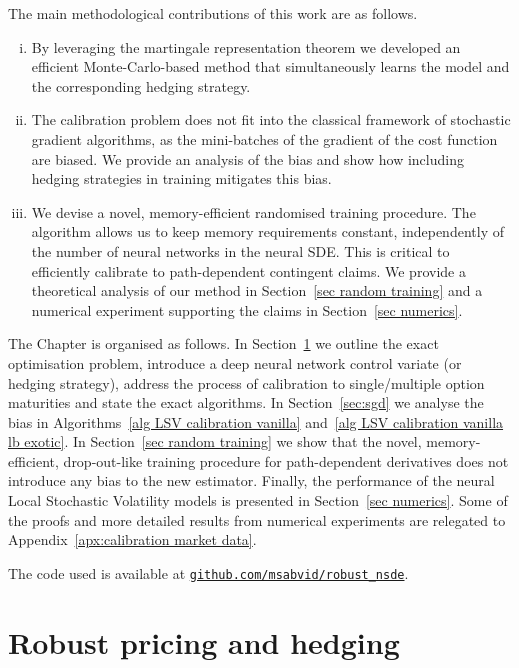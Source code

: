 The main methodological contributions of this work are as follows. 
\begin{enumerate}[i)]
\item By leveraging the martingale representation theorem we developed an efficient Monte-Carlo-based method that simultaneously learns the model and the corresponding hedging strategy.
\item The calibration problem does not fit into the classical framework of stochastic gradient algorithms, as the mini-batches of the gradient of the cost function are biased. 
We provide an analysis of the bias and show how including hedging strategies in training mitigates this bias.  
\item We devise a novel, memory-efficient randomised training procedure. 
The algorithm allows us to keep memory requirements constant, independently of the number of neural networks in the neural SDE.
This is critical to efficiently calibrate to path-dependent contingent claims. 
We provide a theoretical analysis of our method in Section~\ref{sec random training} and a numerical experiment supporting the claims in Section~\ref{sec numerics}. 
 \end{enumerate}

The Chapter is organised as follows. In Section~\ref{sec:Hedging} we outline the exact optimisation problem, introduce a deep neural network control variate (or hedging strategy), address the process of calibration to single/multiple option maturities and state the exact algorithms.
In Section~\ref{sec:sgd} we analyse the bias in Algorithms~\ref{alg LSV calibration vanilla} and~\ref{alg LSV calibration vanilla lb exotic}.
In Section~\ref{sec random training} we show that the novel, memory-efficient, drop-out-like training procedure for path-dependent derivatives does not introduce any bias to the new estimator. 
Finally, the performance of the neural Local Stochastic Volatility models is presented in Section~\ref{sec numerics}. 
Some of the proofs and more detailed results from numerical experiments are relegated to Appendix~\ref{apx:calibration market data}.

The code used is available at \href{https://github.com/msabvid/robust_nsde}{\texttt{github.com/msabvid/robust\_nsde}}.

\section{Robust pricing and hedging}\label{sec:Hedging}

